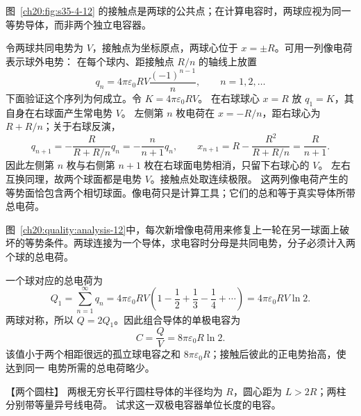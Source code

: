 {图~\ref{ch20:fig:s35-4-12} 的接触点是两球的公共点；在计算电容时，两球应视为同一等势导体，而非两个独立电容器。


\begin{xesolution}
令两球共同电势为 $V$，接触点为坐标原点，两球心位于 $x=\pm R$。可用一列像电荷表示球外电势：
在每个球内、距接触点 $R/n$ 的轴线上放置
\[
 q_n=4\pi\varepsilon_0RV\frac{(-1)^{n-1}}n,
 \qquad n=1,2,\ldots
\]
下面验证这个序列为何成立。令 $K=4\pi\varepsilon_0RV$。
在右球球心 $x=R$ 放 $q_1=K$，其自身在右球面产生常电势 $V$。
左侧第 $n$ 枚电荷在 $x=-R/n$，距右球心为 $R+R/n$；关于右球反演，
\[
 q_{n+1}=-\frac{R}{R+R/n}q_n=-\frac n{n+1}q_n,\qquad
 x_{n+1}=R-\frac{R^2}{R+R/n}=\frac{R}{n+1}.
\]
因此左侧第 $n$ 枚与右侧第 $n+1$ 枚在右球面电势相消，只留下右球心的 $V$。
左右互换同理，故两个球面都是电势 $V$。接触点处取连续极限。
这两列像电荷产生的等势面恰包含两个相切球面。像电荷只是计算工具；它们的总和等于真实导体所带总电荷。

\par\noindent\begin{minipage}{\linewidth}
\begin{qualityfigure}
\touchingSphereImagesFigure
{}\label{ch20:quality:analysis-12}
\end{qualityfigure}
图~\ref{ch20:quality:analysis-12}中，每次新增像电荷用来修复上一轮在另一球面上破坏的等势条件。两球连接为一个导体，求电容时分母是共同电势，分子必须计入两个球的总电荷。
\end{minipage}\par\medskip

一个球对应的总电荷为
\[
 Q_1=\sum_{n=1}^{\infty}q_n
 =4\pi\varepsilon_0RV\left(1-\frac12+\frac13-\frac14+\cdots\right)
 =4\pi\varepsilon_0RV\ln2.
\]
两球对称，所以 $Q=2Q_1$。因此组合导体的单极电容为
\[
 \boxed{C=\frac QV=8\pi\varepsilon_0R\ln2}.
\]
该值小于两个相距很远的孤立球电容之和 $8\pi\varepsilon_0R$；接触后彼此的正电势抬高，使达到同一
电势所需的总电荷略少。
\end{xesolution}



\begin{origexamplebox}{【两个圆柱】}\label{ch20:ex:s35-4-3}
两根无穷长平行圆柱导体的半径均为 $R$，圆心距为 $L>2R$；两柱分别带等量异号线电荷。
试求这一双极电容器单位长度的电容。
\begin{center}
\end{center}
\end{origexamplebox}}
